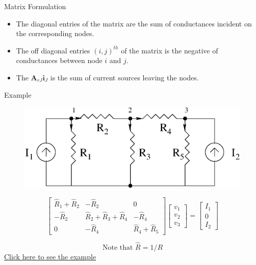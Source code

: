 \documentclass{beamer}
\begin{document}
\begin{frame}[fragile]
\begin{block}{Matrix Formulation}
\begin{itemize}
\item The diagonal entries of the matrix are the sum of conductances incident on the corresponding nodes.
\item The off diagonal entries $(i,j)^{th}$ of the matrix is the negative of conductances between node $i$ and $j$.
\item The $\mathbf{A}_{rJ}\mathbf{i}_{J}$ is the sum of current sources leaving the nodes.
\end{itemize}
\end{block}
\begin{block}{Example}
\end{block}
\begin{minipage}[!b]{0.4\linewidth} %
\begin{figure}[h]
\centering
\includegraphics[scale=0.35]{../figures/nodal_figure.eps}
\end{figure}
\end{minipage}
\begin{minipage}[!b]{0.55\linewidth} %
\begin{tiny}
$$\left[
\begin{array}{ccc}
\widehat{R}_{1}+\widehat{R}_{2} & -\widehat{R}_{2} & 0\\
-\widehat{R}_{2} & \widehat{R}_{2}+\widehat{R}_{3}+\widehat{R}_{4} & -\widehat{R}_{4}\\
0 & -\widehat{R}_{4} & \widehat{R}_{4}+\widehat{R}_{5}
\end{array}
\right] \left[
\begin{array}{c}
v_{1}\\
v_{2}\\
v_{3}
\end{array}
\right]= \left[
\begin{array}{c}
I_{1}\\
0\\
I_{2}
\end{array}
\right]$$
\end{tiny}
\end{minipage}
\tiny $$\mbox{Note that } \widehat{R}=1/R$$
\tiny \href{run:../../LPCSim_1.0/ckt/nodalExample.ckt}{\color{red} Click here to see the example}
\end{frame}
\end{document}
